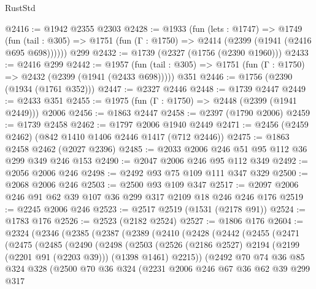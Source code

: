 \begin{lexlean}{RustStd}
\begin{coremodule}
@2416 := @1942 @2355 @2303
@2428 := @1933
    (fun (lets : @1747) =>
    @1749 (fun (tail : @305) => @1751 (fun (Γ : @1750) => @2414 (@2399 (@1941 (@2416 @695 @698))))))
    @299
@2432 := @1739 (@2327 (@1756 (@2390 @1960)))
@2433 := @2416 @299
@2442 := @1957
    (fun (tail : @305) => @1751 (fun (Γ : @1750) => @2432 (@2399 (@1941 (@2433 @698)))))
    @351
@2446 := @1756 (@2390 (@1934 (@1761 @352)))
@2447 := @2327 @2446
@2448 := @1739 @2447
@2449 := @2433 @351
@2455 := @1975 (fun (Γ : @1750) => @2448 (@2399 (@1941 @2449))) @2006
@2456 := @1863 @2447
@2458 := @2397 (@1790 @2006)
@2459 := @1739 @2458
@2462 := @1797 @2006 @1940 @2449
@2471 := @2456 (@2459 @2462) (@842 @1410 @1406 @2446 @1417 (@712 @2446))
@2475 := @1863 @2458 @2462 (@2027 @2396)
@2485 := @2033 @2006 @246 @51 @95 @112 @36 @299 @349 @246 @153
@2490 := @2047 @2006 @246 @95 @112 @349
@2492 := @2056 @2006 @246
@2498 := @2492 @93 @75 @109 @111 @347 @329
@2500 := @2068 @2006 @246
@2503 := @2500 @93 @109 @347
@2517 := @2097 @2006 @246 @91 @62 @39 @107 @36 @299 @317 @2109 @18 @246 @246 @176
@2519 := @2245 @2006 @246
@2523 := @2517 @2519 (@1531 (@2178 @91))
@2524 := @1783 @176
@2526 := @2523 (@2182 @2524)
@2527 := @1806 @176
@2604 := @2324
    (@2346
      (@2385
        (@2387
          (@2389
            (@2410
              (@2428
                (@2442
                  (@2455
                    (@2471
                      (@2475
                        (@2485
                          (@2490
                            (@2498
                              (@2503
                                (@2526
                                  (@2186 @2527)
                                  @2194
                                  (@2199 (@2201 @91 (@2203 @39)))
                                  (@1398 @1461)
                                  @2215))
                              (@2492
                                @70
                                @74
                                @36
                                @85
                                @324
                                @328
                                (@2500
                                  @70
                                  @36
                                  @324
                                  (@2231
                                    @2006
                                    @246
                                    @67
                                    @36
                                    @62
                                    @39
                                    @299
                                    @317

\end{coremodule}
\end{lexlean}
